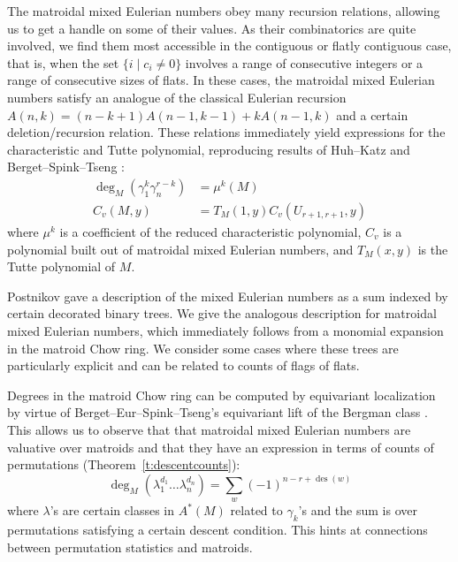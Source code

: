 \documentclass[ALCO,published]{cedram}
\numberwithin{equation}{section}
\numberwithin{figure}{section}
\DeclareMathOperator{\des}{des}
\begin{document}
The matroidal mixed Eulerian numbers obey many recursion relations, allowing us to get a handle on some of their values. As their combinatorics are quite involved, we find them most accessible in the contiguous or flatly contiguous case, that is, when the set $\{i\mid c_i\neq 0\}$ involves a range of consecutive integers or a range of consecutive sizes of flats. In these cases, the matroidal mixed Eulerian numbers satisfy an analogue of the classical Eulerian recursion $A(n,k)=(n-k+1)A(n-1,k-1)+kA(n-1,k)$ and a certain deletion/recursion relation. These relations immediately yield expressions for the characteristic and Tutte polynomial, reproducing results of Huh--Katz \cite{HuhKatz} and Berget--Spink--Tseng \cite{BST}:
\begin{align*}
\deg_M(\gamma_1^k\gamma_n^{r-k})&=\mu^k(M)\\
C_{v}(M,y)&=T_M(1,y)C_{v}(U_{r+1,r+1},y)
\end{align*}
where $\mu^k$ is a coefficient of the reduced characteristic polynomial, $C_{v}$ is a polynomial built out of matroidal mixed Eulerian numbers, and $T_M(x,y)$ is the Tutte polynomial of $M$.

Postnikov gave a description of the mixed Eulerian numbers as a sum indexed by certain decorated binary trees. We give the analogous description for matroidal mixed Eulerian numbers, which immediately follows from a monomial expansion in the matroid Chow ring. We consider some cases where these trees are particularly explicit and can be related to counts of flags of flats.

Degrees in the matroid Chow ring can be computed by equivariant localization by virtue of Berget--Eur--Spink--Tseng's equivariant lift of the Bergman class \cite{BEST}. This allows us to observe that that matroidal mixed Eulerian numbers are valuative over matroids and that they have an expression in terms of counts of permutations (Theorem~\ref{t:descentcounts}):
  \[\deg_M(\lambda_1^{d_1}\dots\lambda_{n}^{d_n})=\sum_{w}(-1)^{n-r+\des(w)}
  \]
where $\lambda$'s are certain classes in $A^*(M)$ related to $\gamma_k$'s and the sum is over permutations satisfying a certain descent condition.
This hints at connections between permutation statistics and matroids.
\end{document}
